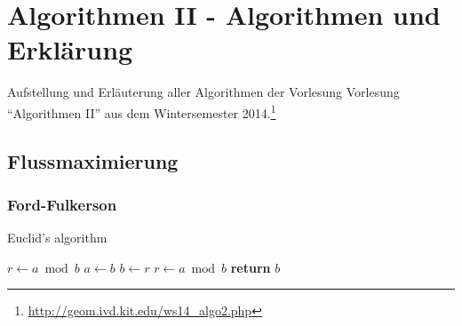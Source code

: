 \chapter{Algorithmen II - Algorithmen und Erklärung}

Aufstellung und Erläuterung aller Algorithmen der Vorlesung Vorlesung "`Algorithmen II"' aus dem Wintersemester 2014.\footnote{\url{http://geom.ivd.kit.edu/ws14_algo2.php}}

\section{Flussmaximierung}

\subsection{Ford-Fulkerson}


\begin{algorithm}
\caption{Euclid’s algorithm}\label{euclid}
\begin{algorithmic}[1]
\State $r\gets a\bmod b$
\State $a\gets b$
\State $b\gets r$
\State $r\gets a\bmod b$
\EndWhile\label{euclidendwhile}
\State \textbf{return} $b$
\EndProcedure
\end{algorithmic}
\end{algorithm}


	


